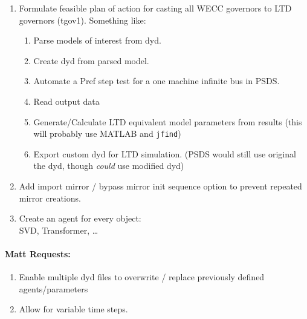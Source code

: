\documentclass[12pt]{article}
\begin{document}
\begin{multicols}{2}
\begin{enumerate}
		\item Formulate feasible plan of action for casting all WECC governors to LTD governors (tgov1). Something like:
		\begin{enumerate}
		\item Parse models of interest from dyd.
		\item Create dyd from parsed model.
		\item Automate a Pref step test for a one machine infinite bus in PSDS.
		\item Read output data
		\item Generate/Calculate LTD equivalent model parameters from results (this will probably use MATLAB and \verb|jfind|)
		\item Export custom dyd for LTD simulation. (PSDS would still use original the dyd, though \emph{could} use modified dyd)
		\end{enumerate}

		\item Add import mirror / bypass mirror init sequence option to prevent repeated mirror creations.

		\item Create an agent for every object: \\ SVD, Transformer, \ldots
		
	\end{enumerate}

\paragraph{Matt Requests:}
\begin{enumerate}
		\item Enable multiple dyd files to overwrite / replace previously defined agents/parameters
		\item Allow for variable time steps.
\end{enumerate}
		
		



\vfill\null

\end{multicols}
\pagebreak
\end{document}

